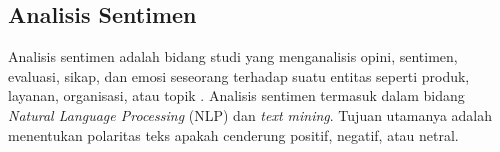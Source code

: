 \subsection{Analisis Sentimen}

Analisis sentimen adalah bidang studi yang menganalisis opini, sentimen, evaluasi, sikap, dan emosi seseorang terhadap suatu entitas seperti produk, layanan, organisasi, atau topik \cite{feldman2013}. Analisis sentimen termasuk dalam bidang \emph{Natural Language Processing} (NLP) dan \emph{text mining}. Tujuan utamanya adalah menentukan polaritas teks apakah cenderung positif, negatif, atau netral.
